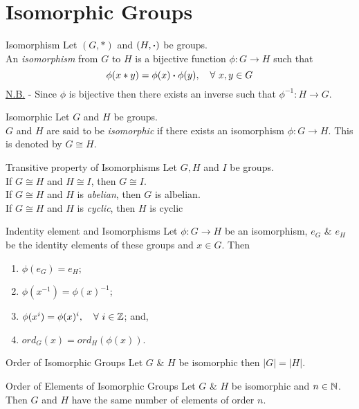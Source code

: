 \documentclass[11pt,a4paper]{article}
\begin{document}
\section{Isomorphic Groups}

\subtitle{Definition 9.1 - }{Isomorphism}
Let $(G, *)$ and $(H, \boldsymbol{\cdot})$ be groups.\\
An \textit{isomorphism} from $G$ to $H$ is a bijective function $\phi : G \to H$ such that $$\phi(x * y) = \phi(x) \boldsymbol{\cdot} \phi(y),\quad \forall\ x, y \in G$$
\underline{N.B.} - Since $\phi$ is bijective then there exists an inverse such that $\phi^{-1} : H \to G$.\\

\subtitle{Definition 9.2 - }{Isomorphic}
Let $G$ and $H$ be groups.\\
$G$ and $H$ are said to be \textit{isomorphic} if there exists an isomorphism $\phi : G \to H$. This is denoted by $G \cong H$.

\subtitle{Proposition 9.3 - }{Transitive property of Isomorphisms}
Let $G, H$ and $I$ be groups.\\
If $G \cong H$  and $H \cong I$, then $G \cong I$.\\
If $G \cong H$ and $H$ is \textit{abelian}, then $G$ is albelian.\\
If $G \cong H$ and $H$ is \textit{cyclic}, then $H$ is cyclic

\subtitle{Proposition 9.4 - }{Indentity element and Isomorphisms}
Let $\phi : G \to H$ be an isomorphism, $e_G$ \& $e_H$ be the identity elements of these groups and $x \in G$. Then
\begin{enumerate}[label=\roman*)]
  \item $\phi(e_G) = e_H$;
  \item $\phi(x^{-1}) = \phi(x)^{-1}$;
  \item $\phi(x^i) = \phi(x)^i,\quad \forall\ i \in \mathbb{Z}$; and,
  \item $ord_G(x) = ord_H(\phi(x))$.
\end{enumerate}

\subtitle{Proposition 9.5 - }{Order of Isomorphic Groups}
Let $G$ \& $H$ be isomorphic then $|G| = |H|$.\\

\subtitle{Proposition 9.5 - }{Order of Elements of Isomorphic Groups}
Let $G$ \& $H$ be isomorphic and $n \in \mathbb{N}$.\\
Then $G$ and $H$ have the same number of elements of order $n$.\\
\end{document}
